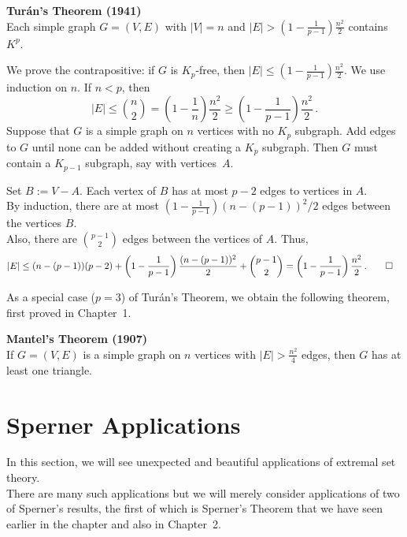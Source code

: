 \documentclass[a4paper]{article}
\let\oldendproof\endproof
\renewenvironment{proof}[1][\proofname]{%
  \oldproof[\scshape \noindent {\bfseries \text{Proof}}]%
}{\oldendproof}
\newenvironment{thm}[1]{
	\begin{framed}
	\noindent
	{\bfseries #1}\\}{\setlength{\itemsep}{0pt}
	\end{framed}
}
\newcommand{\Af}{\mathcal{A}}
\newcommand{\ds}{\displaystyle}
\begin{document}
\begin{thm}{Tur\'an's Theorem (1941)}
Each simple graph $G = (V,E)$ with $|V| = n$ and
$\ds|E| > \left(1 - \frac{1}{p-1}\right)\frac{n^2}{2}$ contains $K^p$.
\end{thm}

\begin{proof}
We prove the contrapositive:
if $G$ is $K_p$-free, then $|E| \leq (1-\frac{1}{p-1})\frac{n^2}{2}$.
We use induction on $n$.
If $n< p$, then
	\[ |E| \leq \binom{n}{2} = \left(1 - \frac{1}{n}\right)\frac{n^2}{2}
           \geq \left(1 -\frac{1}{p-1}\right) \frac{n^2}{2}\,.\]
Suppose that $G$ is a simple graph on $n$ vertices with no $K_p$ subgraph.
Add edges to $G$ until none can be added without creating a $K_p$ subgraph.
Then $G$ must contain a $K_{p-1}$ subgraph, say with vertices~$A$.

Set $B:= V-A$.
Each vertex of $B$ has at most $p-2$ edges to vertices in $A$.\\
By induction, there are at most $(1-\frac{1}{p-1})(n-(p-1))^2/2$ edges between the vertices $B$.\\
Also, there are $\binom{p-1}{2}$ edges between the vertices of $A$. Thus,
\begin{align*}
  |E| & \leq (n-(p-1))(p-2) + \left(1-\frac{1}{p-1}\right) \frac{(n-(p-1))^2}{2} + \binom{p-1}{2}
	     = \left(1-\frac{1}{p-1}\right)\frac{n^2}{2}\,.\qedhere
\end{align*}
\end{proof}

As a special case ($p = 3$) of Tur\'an's Theorem,
we obtain the following theorem, first proved in Chapter~1.
\begin{thm}{Mantel's Theorem (1907)}
If $G = (V,E)$ is a simple graph on $n$ vertices with $|E| > \frac{n^2}{4}$ edges,
then $G$ has at least one triangle.
\end{thm}


\newpage
\section*{Sperner Applications}

In this section, we will see unexpected and beautiful applications of extremal set theory.\\
There are many such applications but we will merely consider applications of two of Sperner's results,
the first of which is Sperner's Theorem that we have seen earlier in the chapter and also in Chapter~2.

\end{document}
